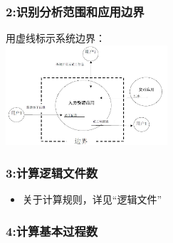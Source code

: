 
\hypertarget{ux8bc6ux522bux5206ux6790ux8303ux56f4ux548cux5e94ux7528ux8fb9ux754c}{%
\subsubsection{2:识别分析范围和应用边界}\label{ux8bc6ux522bux5206ux6790ux8303ux56f4ux548cux5e94ux7528ux8fb9ux754c}}

用虚线标示系统边界：\\

\includegraphics[width=6cm]{功能点计数P62_20.jpg}

\hypertarget{ux8ba1ux7b97ux903bux8f91ux6587ux4ef6ux6570}{%
\subsubsection{3:计算逻辑文件数}\label{ux8ba1ux7b97ux903bux8f91ux6587ux4ef6ux6570}}

\begin{itemize}
\tightlist
\item
  关于计算规则，详见``逻辑文件''
\end{itemize}

\hypertarget{ux8ba1ux7b97ux57faux672cux8fc7ux7a0bux6570}{%
\subsubsection{4:计算基本过程数}\label{ux8ba1ux7b97ux57faux672cux8fc7ux7a0bux6570}}

